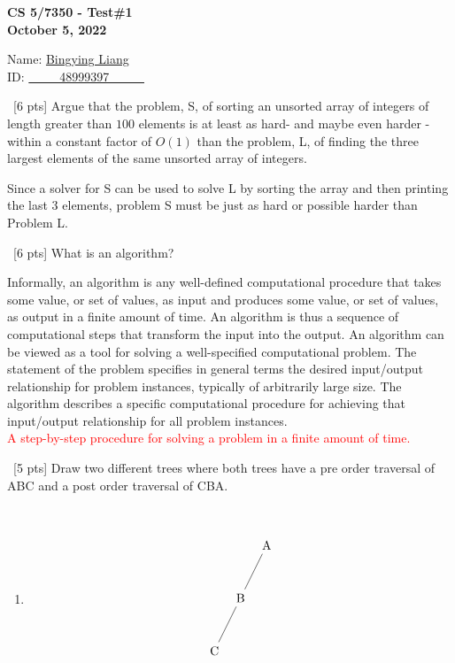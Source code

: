 \documentclass[12pt]{article}
\newenvironment{sol}[1][Solution]{\begin{trivlist}\item[\hskip\labelsep {\bfseries #1:}]}{\end{trivlist}}
\begin{document}
\renewcommand{\qedsymbol}{\filledbox}
\begin{center}
    \textbf{CS 5/7350 - Test\#1} \\
    \textbf{October 5, 2022}
\end{center}
\begin{flushright}
Name: \underline{Bingying Liang }\\
ID:  \underline{\ \ \ \ \ 48999397 \ \ \ \ \ }
\end{flushright}

\begin{enumerate}
    \item \ [6 pts] Argue that the problem, S, of sorting an unsorted array of integers of length greater than $100$ elements is at least as hard- and maybe even harder - within a constant factor of $O(1)$ than the problem, L, of finding the three largest elements of the same unsorted array of integers.
    \begin{sol}
        Since a solver for S can be used to solve L by sorting the array and then printing the last 3 elements, problem S must be just as hard or possible harder than Problem L.
    \end{sol}
    \item \ [6 pts] What is an algorithm?
    \begin{sol}
    Informally, an algorithm is any well-defined computational procedure that takes some value, or set of values, as input and produces some value, or set of values, as output in a finite amount of time. An algorithm is thus a sequence of computational steps that transform the input into the output. An algorithm can be viewed as a tool for solving a well-specified computational problem. The statement of the problem specifies in general terms the desired input/output relationship for problem instances, typically of arbitrarily large size. The algorithm describes a specific computational procedure for achieving that input/output relationship for all problem instances.\\
    \textcolor{red}{A step-by-step procedure for solving a problem in a finite amount of time.}
    \end{sol}

    \item \ [5 pts] Draw two different trees where both trees have a pre order traversal of ABC and a post order traversal of CBA.
    \begin{sol}
    \hspace*{\fill}\\
    \begin{enumerate}
        \item 
        \begin{align*}
        \begin{tikzpicture}
        \node{A}
        child{node{B}
              child {node{C}
              }
              child[missing]
            }
        child[missing];
        \end{tikzpicture}
        \end{align*}


\end{enumerate}
\end{sol}
\end{enumerate}
\end{document}
